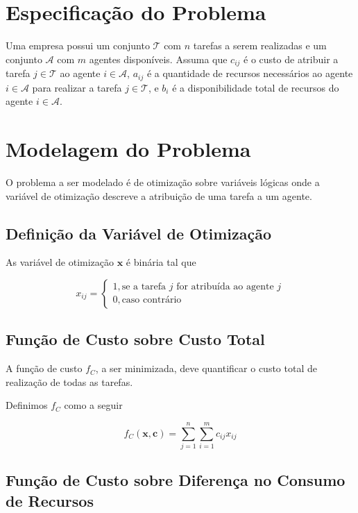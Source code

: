  

\sloppy

\newpage

\section{Especificação do Problema}
Uma empresa possui um conjunto $\mathcal{T}$ com $n$ tarefas a serem realizadas e um conjunto $\mathcal{A}$
com $m$ agentes disponíveis. Assuma que $c_{ij}$ é o custo de atribuir a tarefa  $j\in \mathcal{T}$ ao agente
$i\in \mathcal{A}$, $a_{ij}$ é a quantidade de recursos necessários ao agente $i\in \mathcal{A}$ para realizar a tarefa
$j\in \mathcal{T}$, e $b_i$ é a disponibilidade total de recursos do agente $i\in \mathcal{A}$.



\section{Modelagem do Problema}

O problema a ser modelado é de otimização sobre variáveis lógicas onde a
variável de otimização descreve a atribuição de uma tarefa a um agente.

\subsection{Definição da Variável de Otimização}

As variável de otimização $\mathbf{x}$ é binária tal que

$$ x_{ij} = \begin{cases} 1, \text{se a tarefa $j$ for atribuída ao agente $j$}
                       \\ 0, \text{caso contrário}
            \end{cases} $$

\subsection{Função de Custo sobre Custo Total}

A função de custo $f_C$, a ser minimizada, deve quantificar o custo total de
realização de todas as tarefas.

Definimos $f_C$ como a seguir

$$ f_C(\mathbf{x}, \mathbf{c}) = \sum^{n}_{j=1}\sum^{m}_{i=1} c_{ij} x_{ij} $$

\subsection{Função de Custo sobre Diferença no Consumo de Recursos}

